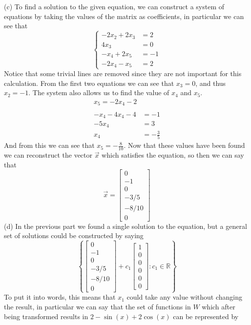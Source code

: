 \documentclass{report}
\begin{document}
(c) To find a solution to the given equation, we can construct a system of equations by taking the values of the matrix as coefficients, in particular we can see that
$$
\left\{
\begin{aligned}
-2x_2 + 2x_3 & = 2 \\
4x_3 & = 0 \\
-x_4 + 2x_5 & = -1 \\
-2x_4 - x_5 & = 2
\end{aligned}
\right.
$$
Notice that some trivial lines are removed since they are not important for this calculation. From the first two equations we can see that $x_3 = 0$, and thus $x_2 = -1$. The system also allows us to find the value of $x_4$ and $x_5$.
$$
\begin{aligned}
x_5 = -2x_4 - 2 \\
\\
-x_4 - 4x_4 -4 & = -1 \\
-5x_4 & = 3 \\
x_4 & = -\frac{3}{5}
\end{aligned}
$$
And from this we can see that $x_5 = -\frac{8}{10}$. Now that these values have been found we can reconstruct the vector $\vec{x}$ which satisfies the equation, so then we can say that
$$
\vec{x} = \begin{bmatrix} 0 \\ -1 \\ 0 \\ -3/5 \\ -8/10 \\ 0 \end{bmatrix}
$$
(d) In the previous part we found a single solution to the equation, but a general set of solutions could be constructed by saying
$$
\left\{
\begin{bmatrix} 0 \\ -1 \\ 0 \\ -3/5 \\ -8/10 \\ 0 \end{bmatrix} + c_1 \begin{bmatrix} 1 \\ 0 \\ 0 \\ 0 \\ 0  \\ 0 \end{bmatrix} : c_1 \in \mathbb{R}
\right\}
$$
To put it into words, this means that $x_1$ could take any value without changing the result, in particular we can say that the set of functions in $W$ which after being transformed results in $2 - \sin(x) + 2\cos(x)$ can be represented by
\end{document}
